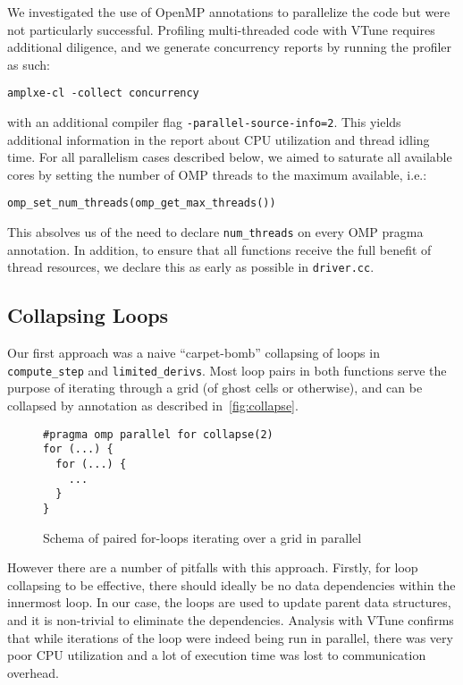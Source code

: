 \documentclass{scrartcl}
\begin{document}
    We investigated the use of OpenMP annotations to parallelize the code but were not particularly successful. Profiling multi-threaded code with VTune requires additional diligence, and we generate concurrency reports by running the profiler as such:
    \begin{verbatim}amplxe-cl -collect concurrency\end{verbatim}
    with an additional compiler flag \verb|-parallel-source-info=2|. This yields additional information in the report about CPU utilization and thread idling time. For all parallelism cases described below, we aimed to saturate all available cores by setting the number of OMP threads to the maximum available, i.e.:
    \begin{verbatim}omp_set_num_threads(omp_get_max_threads())\end{verbatim}
    This absolves us of the need to declare \verb|num_threads| on every OMP pragma annotation. In addition, to ensure that all functions receive the full benefit of thread resources, we declare this as early as possible in \verb|driver.cc|.

    \subsection{Collapsing Loops}
    Our first approach was a naive ``carpet-bomb'' collapsing of loops in \verb|compute_step| and \verb|limited_derivs|. Most loop pairs in both functions serve the purpose of iterating through a grid (of ghost cells or otherwise), and can be collapsed by annotation as described in~\autoref{fig:collapse}.

    \begin{figure}[ht!]
    \begin{lstlisting}
#pragma omp parallel for collapse(2)
for (...) {
  for (...) {
    ...
  }
}
    \end{lstlisting}
    \caption{Schema of paired for-loops iterating over a grid in parallel\label{fig:collapse}}
    \end{figure}

    However there are a number of pitfalls with this approach. Firstly, for loop collapsing to be effective, there should ideally be no data dependencies within the innermost loop. In our case, the loops are used to update parent data structures, and it is non-trivial to eliminate the dependencies. Analysis with VTune confirms that while iterations of the loop were indeed being run in parallel, there was very poor CPU utilization and a lot of execution time was lost to communication overhead.
\end{document}
